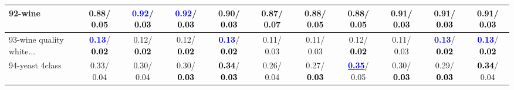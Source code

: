 \begin{table}[h]
\begin{center}
{\begin{tabular}{lc|c|c|c|c|c|c|c|c|c}
92-wine &   0.88/  0.05 & \textcolor{blue}{\textbf{  0.92}}/\textcolor{black}{\textbf{  0.03}} & \textcolor{blue}{\textbf{  0.92}}/\textcolor{black}{\textbf{  0.03}} &   0.90/\textcolor{black}{\textbf{  0.03}} &   0.87/  0.07 &   0.88/  0.05 &   0.88/  0.05 &   0.91/\textcolor{black}{\textbf{  0.03}} &   0.91/\textcolor{black}{\textbf{  0.03}} &   0.91/\textcolor{black}{\textbf{  0.03}} \\ \hline
93-wine quality white... & \textcolor{blue}{\textbf{  0.13}}/\textcolor{black}{\textbf{  0.02}} &   0.12/\textcolor{black}{\textbf{  0.02}} &   0.12/\textcolor{black}{\textbf{  0.02}} & \textcolor{blue}{\textbf{  0.13}}/\textcolor{black}{\textbf{  0.02}} &   0.11/  0.03 &   0.11/  0.03 &   0.12/\textcolor{black}{\textbf{  0.02}} &   0.11/  0.03 & \textcolor{blue}{\textbf{  0.13}}/\textcolor{black}{\textbf{  0.02}} & \textcolor{blue}{\textbf{  0.13}}/\textcolor{black}{\textbf{  0.02}} \\
94-yeast 4class &   0.33/  0.04 &   0.30/  0.04 &   0.30/\textcolor{black}{\textbf{  0.03}} & \textcolor{black}{\textbf{  0.34}}/\textcolor{black}{\textbf{  0.03}} &   0.26/  0.04 &   0.27/\textcolor{black}{\textbf{  0.03}} & \underline{\textcolor{blue}{\textbf{  0.35}}}/  0.05 &   0.30/\textcolor{black}{\textbf{  0.03}} &   0.29/\textcolor{black}{\textbf{  0.03}} & \textcolor{black}{\textbf{  0.34}}/  0.04 \\\end{tabular}}\label{stratsALCKappa2bestb}
\end{center}
\end{table}